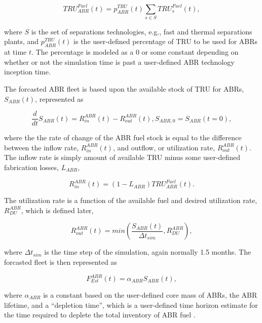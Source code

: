 \begin{equation}
 TRU^{Fuel}_{ABR}(t) = p^{TRU}_{ABR}(t) \sum_{s \in S} TRU^{Fuel}_s(t),
\end{equation}

where $S$ is the set of separations technologies, e.g., fast and thermal
separations plants, and $p^{TRU}_{ABR}(t)$ is the user-defined percentage of TRU
to be used for ABRs at time $t$. The percentage is modeled as a 0 or some
constant depending on whether or not the simulation time is past a user-defined
ABR technology inception time. 

The forcasted ABR fleet is based upon the available stock of TRU for ABRs,
$S_{ABR}(t)$, represented as

\begin{equation}
 \frac{d}{dt}S_{ABR}(t) = R_{in}^{ABR}(t) - R_{out}^{ABR}(t), S_{ABR,0} = S_{ABR}(t=0),
\end{equation}

where the the rate of change of the ABR fuel stock is equal to the difference
between the inflow rate, $R_{in}^{ABR}(t)$, and outflow, or utilization rate,
$R_{out}^{ABR}(t)$. The inflow rate is simply amount of available TRU minus some
user-defined fabrication losses, $L_{ABR}$,

\begin{equation}
 R_{in}^{ABR}(t) = \left( 1 - L_{ABR} \right) TRU^{Fuel}_{ABR}(t).
\end{equation}

The utilization rate is a function of the available fuel and desired utilization
rate, $R^{ABR}_{DU}$, which is defined later,

\begin{equation}
 R_{out}^{ABR}(t) = min \left( \frac{S_{ABR}(t)}{\Delta t_{sim}}, R^{ABR}_{DU}\right),
\end{equation}

where $\Delta t_{sim}$ is the time step of the simulation, again normally 1.5
months. The forcasted fleet is then represented as

\begin{equation}
 F_{Est}^{ABR}(t) = \alpha_{ABR} S_{ABR}(t),
\end{equation}

where $\alpha_{ABR}$ is a constant based on the user-defined core mass of ABRs,
the ABR lifetime, and a ``depletion time'', which is a user-defined time horizon
estimate for the time required to deplete the total inventory of ABR
fuel \cite{busquim_e_silva_system_2008}.

